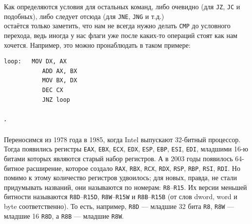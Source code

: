 \documentclass{article}
\newcommand{\asm}[1]{\texttt{#1}}
\begin{document}
    Как определяются условия для остальных команд, либо очевидно (для \asm{JZ}, \asm{JC} и подобных), либо следует отсюда (для \asm{JNE}, \asm{JNG} и т.д.)\\
    остаётся только заметить, что нам не всегда нужно делать \asm{CMP} до условного перехода, ведь иногда у нас флаги уже после каких-то операций стоят как нам хочется. Например, это можно пронаблюдать в таком примере:
    \begin{verbatim}
loop:   MOV DX, AX
           ADD AX, BX
           MOV BX, DX
           DEC CX
           JNZ loop
    \end{verbatim}
    \subparagraph{.}
    Переносимся из 1978 года в 1985, когда Intel выпускают 32-битный процессор. Тогда появились регистры \asm{EAX}, \asm{EBX}, \asm{ECX}, \asm{EDX}, \asm{ESP}, \asm{EBP}, \asm{ESI}, \asm{EDI}, младшими 16-ю битами которых являются старый набор регистров. А в 2003 годы появилось 64-битное расширение, которое создало \asm{RAX}, \asm{RBX}, \asm{RCX}, \asm{RDX}, \asm{RSP}, \asm{RBP}, \asm{RSI}, \asm{RDI}. Но помимо к этому количество регистров удвоилось; для новых, правда, не стали придумывать названий, они называются по номерам: \asm{R8}--\asm{R15}. Их версии меньшей битности называются \asm{R8D}--\asm{R15D}, \asm{R8W}--\asm{R15W} и \asm{R8B}--\asm{R15B} (от слов dword, word и byte соответственно). То есть, например, \asm{R8D} --- младшие 32 бита \asm{R8}, \asm{R8W} --- младшие 16 \asm{R8D}, а \asm{R8B} --- младшие \asm{R8W}.
\end{document}
